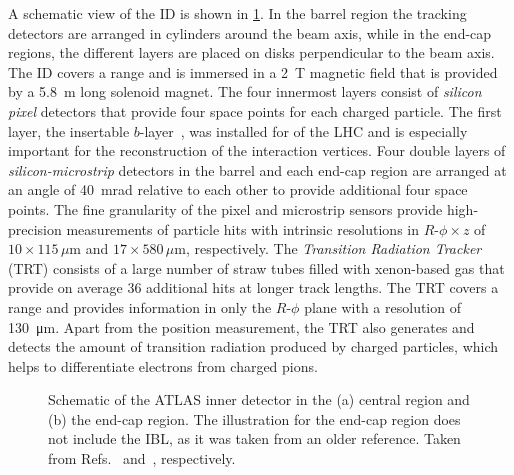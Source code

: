 A schematic view of the ID is shown in \cref{fig:ATLASinnerdetector}.
In the barrel region the tracking detectors are arranged in cylinders around the beam axis, while in the end-cap regions, the different layers are placed on disks perpendicular to the beam axis.
The ID covers a range  and is immersed in a \SI{2}{\tesla} magnetic field that is provided by a \SI{5.8}{\m} long solenoid magnet.
The four innermost layers consist of \emph{silicon pixel} detectors that provide four space points for each charged particle. The first layer, the insertable $b$-layer~\cite{ATLAS-TDR-19,PIX-2018-001}, was installed for \RunTwo of the LHC and is especially important for the reconstruction of the interaction vertices.
Four double layers of \emph{silicon-microstrip} detectors in the barrel and each end-cap region are arranged at an angle of \SI{40}{\milli\radian} relative to each other to provide additional four space points. 
The fine granularity of the pixel and microstrip sensors provide high-precision measurements of particle hits with intrinsic resolutions in $R$-$\phi \times z$ of $10 \times 115\,\mu\text{m}$ and $17 \times 580\,\mu\text{m}$, respectively.
The \emph{Transition Radiation Tracker} (TRT) consists of a large number of straw tubes filled with xenon-based gas that provide on average 36 additional hits at longer track lengths. The TRT covers a range  and provides information in only the $R$-$\phi$ plane with a resolution of \SI{130}{\micro\meter}.
Apart from the position measurement, the TRT also generates and detects the amount of transition radiation produced by charged particles, which helps to differentiate electrons from charged pions.

\begin{figure}
    \caption{Schematic of the ATLAS inner detector in the (a) central region and (b) the end-cap region. The illustration for the end-cap region does not include the IBL, as it was taken from an older reference. Taken from Refs.~\cite{ATL-PHYS-PUB-2015-009} and~\cite{PERF-2007-01}, respectively.}
    \label{fig:ATLASinnerdetector}
\end{figure}


